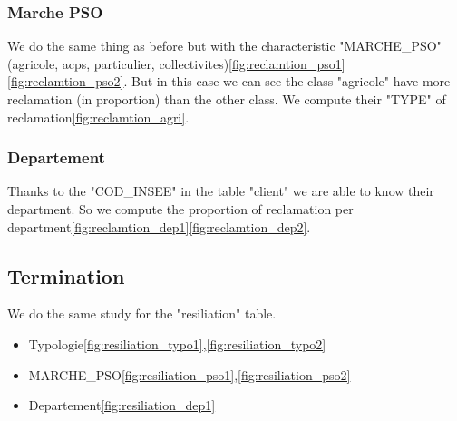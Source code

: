 \documentclass[a4paper, 11pt]{article}
\begin{document}
       \subsubsection{Marche PSO}
       		We do the same thing as before but with the characteristic "MARCHE\_PSO" (agricole, acps, particulier, collectivites)\ref{fig:reclamtion_pso1}\ref{fig:reclamtion_pso2}. But in this case we can see the class "agricole" have more reclamation (in proportion) than the other class. We compute their "TYPE" of reclamation\ref{fig:reclamtion_agri}. 
            
       \subsubsection{Departement}
       		Thanks to the "COD\_INSEE" in the table "client" we are able to know their department. So we compute the proportion of reclamation per department\ref{fig:reclamtion_dep1}\ref{fig:reclamtion_dep2}. 
            
       \subsection{Termination}
       		We do the same study for the "resiliation" table.
            \begin{itemize}
            \item Typologie\ref{fig:resiliation_typo1},\ref{fig:resiliation_typo2}
            \item MARCHE\_PSO\ref{fig:resiliation_pso1},\ref{fig:resiliation_pso2}
            \item Departement\ref{fig:resiliation_dep1}
            \end{itemize}
            

\end{document}
